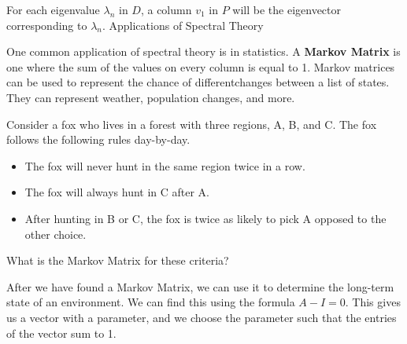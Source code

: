 \documentclass{article}
\begin{document}
For each eigenvalue $\lambda_n$ in $D$, a column $v_1$ in $P$ will be the eigenvector
corresponding to $\lambda_n$.\newline
\newline
\huge
Applications of Spectral Theory
\newline
\normalsize

One common application of spectral theory is in statistics. A \textbf{Markov Matrix}
is one where the sum of the values on every column is equal to 1. 
Markov matrices can be used to represent the chance of differentchanges between a list of states.
They can represent weather, population changes, and more.
\begin{ex}
    Consider a fox who lives in a forest with three regions, A, B, and C.
    The fox follows the following rules day-by-day.
    \begin{itemize}
        \item The fox will never hunt in the same region twice in a row.
        \item The fox will always hunt in C after A.
        \item After hunting in B or C, the fox is twice as likely to pick A opposed to the other choice.
    \end{itemize}
    What is the Markov Matrix for these criteria?
\end{ex}

After we have found a Markov Matrix, we can use it to determine the long-term 
state of an environment. We can find this using the formula $A-I=0$.
This gives us a vector with a parameter, and we choose the parameter such that the
entries of the vector sum to 1.

\par
\end{document}
